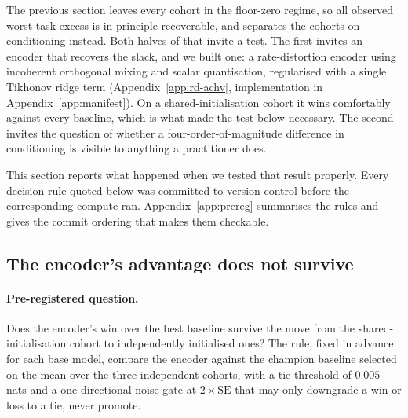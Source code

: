 The previous section leaves every cohort in the floor-zero regime, so all
observed worst-task excess is in principle recoverable, and separates the
cohorts on conditioning instead. Both halves of that invite a test. The
first invites an encoder that recovers the slack, and we built one: a
rate-distortion encoder using incoherent orthogonal mixing and scalar
quantisation, regularised with a single Tikhonov ridge term
(Appendix~\ref{app:rd-achv}, implementation in Appendix~\ref{app:manifest}).
On a shared-initialisation cohort it wins comfortably against every
baseline, which is what made the test below necessary. The second invites the question of
whether a four-order-of-magnitude difference in conditioning is visible to
anything a practitioner does.

This section reports what happened when we tested that result properly.
Every decision rule quoted below was committed to version control before
the corresponding compute ran. Appendix~\ref{app:prereg} summarises the
rules and gives the commit ordering that makes them checkable.

\subsection{The encoder's advantage does not survive}
\label{subsec:q1}

\paragraph{Pre-registered question.} Does the encoder's win over the
best baseline survive the move from the shared-initialisation cohort to
independently initialised ones? The rule, fixed in advance: for each base
model, compare the encoder against the champion baseline selected on the
mean over the three independent cohorts, with a tie threshold of $0.005$
nats and a one-directional noise gate at $2\times\mathrm{SE}$ that may
only downgrade a win or loss to a tie, never promote.

